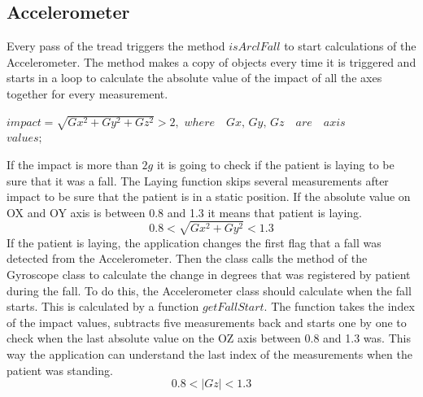 \documentclass[hidelinks,conference,12pt]{IEEETran}
\begin{document}
\subsection{Accelerometer}
Every pass of the tread triggers the method $isArclFall$ to start calculations of the Accelerometer. The method makes a copy of objects every time it is triggered and starts in a loop to calculate the absolute value of the impact of all the axes together for every measurement.
\begin{center}
	$impact = \sqrt{Gx^2 + Gy^2 + Gz^2} > 2,$
	$where \quad \textit{Gx, Gy, Gz} \quad are \quad axis $ \\
	$values;$
\end{center}
If the impact is more than $2g$ it is going to check if the patient is laying to be sure that it was a fall. The Laying function skips several measurements after impact to be sure that the patient is in a static position. If the absolute value on OX and OY axis is between 0.8 and 1.3 it means that patient is laying.
$$ 0.8 < \sqrt{Gx^2 + Gy^2} < 1.3 $$
If the patient is laying, the application changes the first flag that a fall was detected from the Accelerometer. Then the class calls the method of the Gyroscope class to calculate the change in degrees that was registered by patient during the fall. To do this, the Accelerometer class should calculate when the fall starts. This is calculated by a function $getFallStart$. The function takes the index of the impact values, subtracts five measurements back and starts one by one to check when the last absolute value on the OZ axis between 0.8 and 1.3 was. This way the application can understand the last index of the measurements when the patient was standing.
$$ 0.8 < \left|Gz\right| < 1.3 $$
\end{document}
